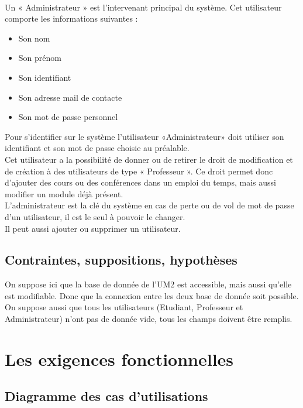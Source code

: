 \documentclass[a4paper, 11pt]{article}
\begin{document}
\\Un « Administrateur » est l'intervenant principal du système. Cet utilisateur comporte les informations suivantes :
        \begin{itemize}
        \item Son nom
        \item Son prénom
        \item Son identifiant
        \item Son adresse mail de contacte
        \item Son mot de passe personnel
        \end{itemize}
Pour s'identifier sur le système l'utilisateur «Administrateur» doit utiliser son identifiant et son mot de passe choisie au préalable.\\Cet utilisateur a la possibilité de donner ou de retirer le droit de modification et de création à des utilisateurs de type « Professeur ». Ce droit permet donc d'ajouter des cours ou des conférences dans un emploi du temps, mais aussi modifier un module déjà présent.\\L'administrateur est la clé du système en cas de perte ou de vol de mot de passe d'un utilisateur, il est le seul à pouvoir le changer.\\Il peut aussi ajouter ou supprimer un utilisateur.
        \subsection{ Contraintes, suppositions, hypothèses}
        On suppose ici que la base de donnée de l'UM2 est accessible, mais aussi qu'elle est modifiable. Donc que la connexion entre les deux base de donnée soit possible.\\On suppose aussi que tous les utilisateurs (Etudiant, Professeur et Administrateur) n'ont pas de donnée vide, tous les champs doivent être remplis.
        \clearpage
        \section{ Les exigences fonctionnelles}
        \subsection{ Diagramme des cas d'utilisations}
\end{document}
